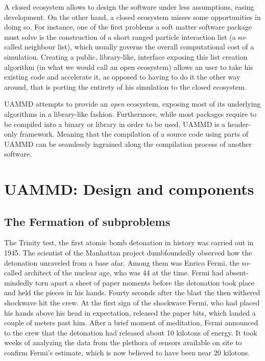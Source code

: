 \documentclass[ twoside,openright,titlepage,numbers=noenddot,%
headinclude,footinclude,cleardoublepage=empty,abstract=on,
BCOR=5mm,paper=a4,fontsize=11pt, dvipsnames
]{scrreprt}
\newcommand{\uammd}{\gls{UAMMD}\xspace}
\newcommand{\gpu}{\gls{GPU}\xspace}
\begin{document}
A closed ecosystem allows to design the software under less assumptions, easing development. On the other hand, a closed ecosystem misses some opportunities in doing so. For instance, one of the first problems a soft matter software package must solve is the construction of a short ranged particle interaction list (a so-called neighbour list), which usually governs the overall computational cost of a simulation. Creating a public, library-like, interface exposing this list creation algorithm (in what we would call an open ecosystem) allows an user to take his existing code and accelerate it, as opposed to having to do it the other way around, that is porting the entirety of his simulation to the closed ecosystem.

\uammd attempts to provide an \emph{open} ecosystem, exposing most of its underlying algorithms in a library-like fashion.
Furthermore, while most packages require to be compiled into a binary or library in order to be used, \uammd is a header-only framework. Meaning that the compilation of a source code using parts of \uammd can be seamlessly ingrained along the compilation process of another software.


\newpage
\cleardoublepage
{}
\part{UAMMD: Design and components}\label{pt:uammd}

\chapter{The Fermation of subproblems}
The Trinity test, the first atomic bomb detonation in history was carried out in 1945. The scientist of the Manhattan project dumbfoundedly observed how the detonation unraveled from a base afar. Among them was Enrico Fermi, the so-called architect of the nuclear age, who was 44 at the time. Fermi had absent-mindedly torn apart a sheet of paper moments before the detonation took place and held the pieces in his hands. Fourty seconds after the blast the then withered shockwave hit the crew. At the first sign of the shockwave Fermi, who had placed his hands above his head in expectation, released the paper bits, which landed a couple of meters past him. After a brief moment of meditation, Fermi announced to the crew that the detonation had released about 10 kilotons of energy.
It took weeks of analyzing the data from the plethora of sensors available on site to confirm Fermi's estimate, which is now believed to have been near 20 kilotons.
\end{document}
